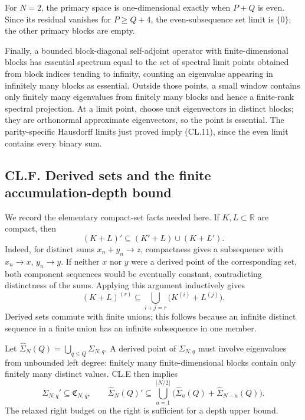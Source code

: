 For \(N=2\), the primary space is one-dimensional exactly when \(P+Q\) is even. Since its residual vanishes for \(P\geq Q+4\), the even-subsequence set limit is \(\{0\}\); the other primary blocks are empty.

Finally, a bounded block-diagonal self-adjoint operator with finite-dimensional blocks has essential spectrum equal to the set of spectral limit points obtained from block indices tending to infinity, counting an eigenvalue appearing in infinitely many blocks as essential. Outside those points, a small window contains only finitely many eigenvalues from finitely many blocks and hence a finite-rank spectral projection. At a limit point, choose unit eigenvectors in distinct blocks; they are orthonormal approximate eigenvectors, so the point is essential. The parity-specific Hausdorff limits just proved imply (CL.11), since the even limit contains every binary sum.

\hypertarget{cl.f.-derived-sets-and-the-finite-accumulation-depth-bound}{%
\subsection{CL.F. Derived sets and the finite accumulation-depth bound}\label{cl.f.-derived-sets-and-the-finite-accumulation-depth-bound}}

We record the elementary compact-set facts needed here. If \(K,L\subset\mathbb R\) are compact, then \[
(K+L)'\subseteq(K'+L)\cup(K+L').
\tag{CL.F1}
\] Indeed, for distinct sums \(x_n+y_n\to z\), compactness gives a subsequence with \(x_n\to x\), \(y_n\to y\). If neither \(x\) nor \(y\) were a derived point of the corresponding set, both component sequences would be eventually constant, contradicting distinctness of the sums. Applying this argument inductively gives \[
(K+L)^{(r)}
\subseteq\bigcup_{i+j=r}\bigl(K^{(i)}+L^{(j)}\bigr).
\tag{CL.F2}
\] Derived sets commute with finite unions; this follows because an infinite distinct sequence in a finite union has an infinite subsequence in one member.

Let \(\widehat\Sigma_N(Q)=\bigcup_{q\leq Q}\Sigma_{N,q}\). A derived point of \(\Sigma_{N,q}\) must involve eigenvalues from unbounded left degree: finitely many finite-dimensional blocks contain only finitely many distinct values. CL.E then implies \[
\Sigma_{N,q}'\subseteq\mathfrak C_{N,q},\qquad
\widehat\Sigma_N(Q)'
\subseteq
\bigcup_{a=1}^{\lfloor N/2\rfloor}
\bigl(\widehat\Sigma_a(Q)+\widehat\Sigma_{N-a}(Q)\bigr).
\tag{CL.F3}
\] The relaxed right budget on the right is sufficient for a depth upper bound.

